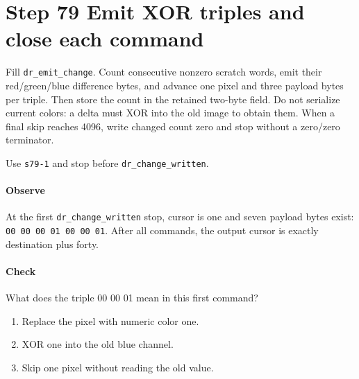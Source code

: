 \section{Step 79 Emit XOR triples and close each command}
Fill \texttt{dr\_emit\_change}. Count consecutive nonzero scratch words, emit their red/green/blue difference bytes, and advance one pixel and three payload bytes per triple. Then store the count in the retained two-byte field. Do not serialize current colors: a delta must XOR into the old image to obtain them. When a final skip reaches 4096, write changed count zero and stop without a zero/zero terminator.

Use \texttt{s79-1} and stop before \texttt{dr\_change\_written}.

\paragraph{Observe} At the first \texttt{dr\_change\_written} stop, cursor is one and seven payload bytes exist: \texttt{00 00 00 01 00 00 01}. After all commands, the output cursor is exactly destination plus forty.

\paragraph{Check} What does the triple 00 00 01 mean in this first command?
\begin{enumerate}[label=\Alph*.]
\item Replace the pixel with numeric color one.
\item XOR one into the old blue channel.
\item Skip one pixel without reading the old value.
\end{enumerate}
